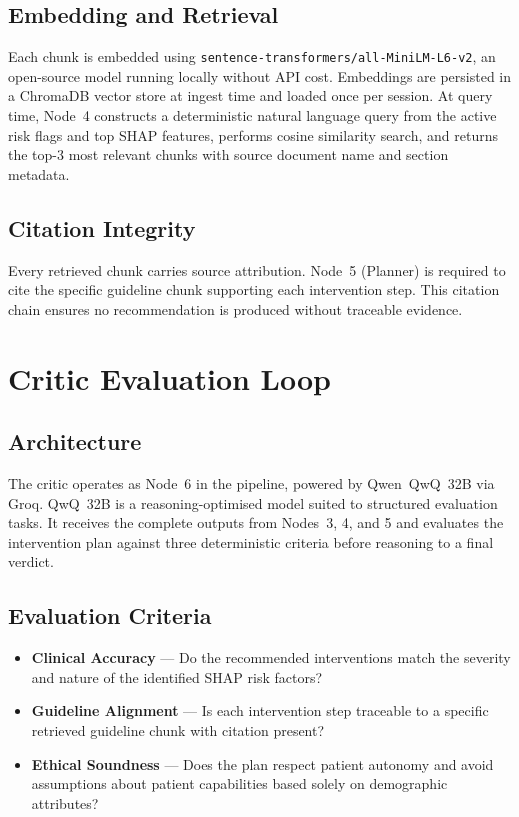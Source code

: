\documentclass[12pt, a4paper]{report}
\begin{document}
\subsection{Embedding and Retrieval}

Each chunk is embedded using \texttt{sentence-transformers/all-MiniLM-L6-v2}, an open-source model running locally without API cost. Embeddings are persisted in a ChromaDB vector store at ingest time and loaded once per session. At query time, Node~4 constructs a deterministic natural language query from the active risk flags and top SHAP features, performs cosine similarity search, and returns the top-3 most relevant chunks with source document name and section metadata.

\subsection{Citation Integrity}

Every retrieved chunk carries source attribution. Node~5 (Planner) is required to cite the specific guideline chunk supporting each intervention step. This citation chain ensures no recommendation is produced without traceable evidence.

\section{Critic Evaluation Loop}

\subsection{Architecture}

The critic operates as Node~6 in the pipeline, powered by Qwen~QwQ~32B via Groq. QwQ~32B is a reasoning-optimised model suited to structured evaluation tasks. It receives the complete outputs from Nodes~3, 4, and 5 and evaluates the intervention plan against three deterministic criteria before reasoning to a final verdict.

\subsection{Evaluation Criteria}

\begin{itemize}
  \item \textbf{Clinical Accuracy} --- Do the recommended interventions match the severity and nature of the identified SHAP risk factors?
  \item \textbf{Guideline Alignment} --- Is each intervention step traceable to a specific retrieved guideline chunk with citation present?
  \item \textbf{Ethical Soundness} --- Does the plan respect patient autonomy and avoid assumptions about patient capabilities based solely on demographic attributes?
\end{itemize}
\end{document}
